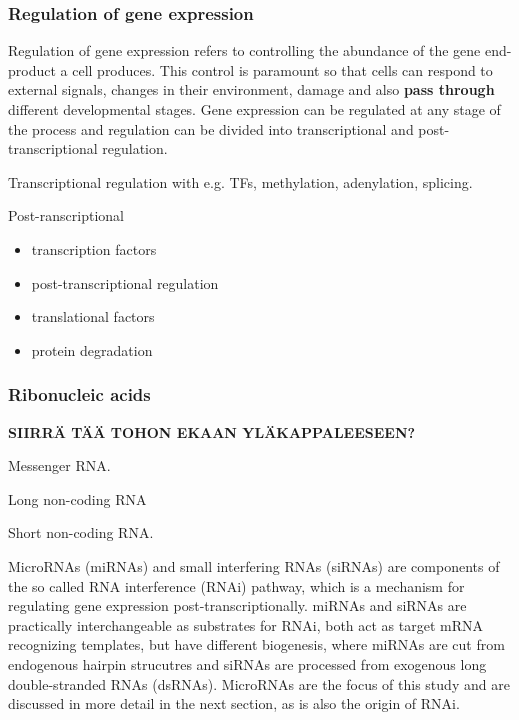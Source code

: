 \subsubsection{Regulation of gene expression}\label{regulation-of-gene-expression}

Regulation of gene expression refers to controlling the abundance of
the gene end-product a cell produces. This control is paramount so that cells
can respond to external signals, changes in their environment, damage and also 
\textbf{pass through} different developmental stages. Gene expression can be regulated
at any stage of the process and regulation can be divided into transcriptional
and post-transcriptional regulation.

Transcriptional regulation with e.g. TFs, methylation, adenylation, splicing.

Post-ranscriptional

\begin{itemize}
  \item transcription factors
  \item post-transcriptional regulation
  \item translational factors
  \item protein degradation
\end{itemize}



\subsubsection{Ribonucleic acids}\label{ribonucleic-acids}

\textbf{SIIRRÄ TÄÄ TOHON EKAAN YLÄKAPPALEESEEN?}

Messenger RNA.

Long non-coding RNA

Short non-coding RNA.

MicroRNAs (miRNAs) and small interfering RNAs (siRNAs) are components of the
so called RNA interference (RNAi) pathway, which is a mechanism for regulating
gene expression post-transcriptionally. miRNAs and siRNAs are practically
interchangeable as substrates for RNAi, both act as target mRNA recognizing
templates, but have different biogenesis, where miRNAs are cut from endogenous hairpin
strucutres and siRNAs are processed from exogenous long double-stranded RNAs (dsRNAs).
\cite{Du2005} MicroRNAs are the focus of this study and are discussed in more
detail in the next section, as is also the origin of RNAi.

